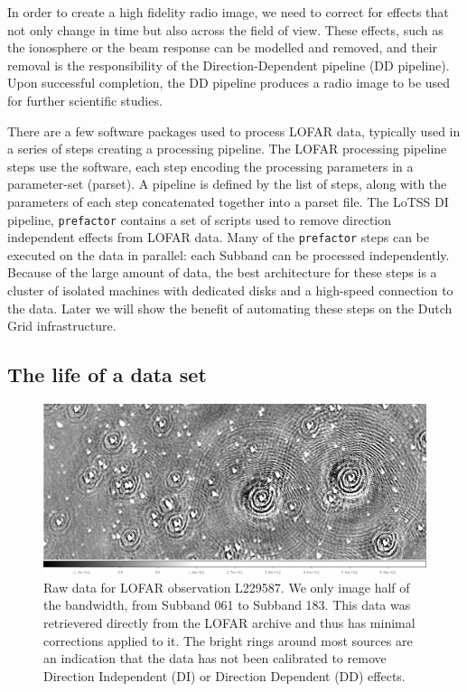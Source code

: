 In order to create a high fidelity radio image, we need to correct for effects that not only change in time but also across the field of view. These effects, such as the ionosphere or the beam response can be modelled and removed, and their removal is the responsibility of the Direction-Dependent pipeline (DD pipeline). Upon successful completion, the DD pipeline produces a radio image to be used for further scientific studies.

There are a few software packages used to process LOFAR data, typically used in a series of steps creating a processing pipeline. The LOFAR processing pipeline steps use the software, each step encoding the processing parameters in a parameter-set (parset). A pipeline is defined by the list of steps, along with the parameters of each step concatenated together into a parset file. The LoTSS DI pipeline, \texttt{prefactor} contains a set of scripts used to remove direction independent effects from LOFAR data. Many of the \texttt{prefactor} steps can be executed on the data in parallel: each Subband can be processed independently. Because of the large amount of data, the best architecture for these steps is a cluster of isolated machines with dedicated disks and a high-speed connection to the data. Later we will show the benefit of automating these steps on the Dutch Grid infrastructure. 

\subsection{The life of a data set}

\begin{figure}[!htb]
    \centering
    \includegraphics[width=.8\linewidth]{background/figures/raw_image1_brighter.jpeg}
    \caption[Image of the raw data]{Raw data for LOFAR observation L229587. We only image half of the bandwidth, from Subband 061 to Subband 183. This data was retrievered directly from the LOFAR archive and thus has minimal corrections applied to it. The bright rings around most sources are an indication that the data has not been calibrated to remove Direction Independent (DI) or Direction Dependent (DD) effects. }
    \label{fig:L229587_raw}
\end{figure}


